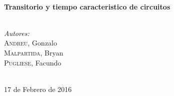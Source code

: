 \begin{titlepage}
\HRule \\[0.4cm]
{ \huge \bfseries Transitorio y tiempo caracteristico de circuitos}\\[0.2cm] %
\HRule \\[1cm]
 

\begin{minipage}{0.4\textwidth}
\begin{center} \large
\emph{Autores:}\\
\textsc{Andreu}, Gonzalo\\ %
\textsc{Malpartida}, Bryan\\ %
\textsc{Pugliese}, Facundo\\ %


\end{center}
\end{minipage}
~ \\[1.25cm]





{\large 17 de Febrero de 2016}\\[1.75cm] %



\end{titlepage}
